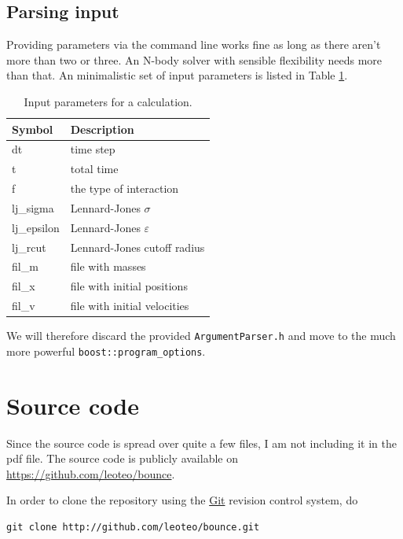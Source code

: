 \documentclass{scrartcl}
\begin{document}
\subsection{Parsing input}

Providing parameters via the command line works fine as long as there aren't
more than two or three.
An N-body solver with sensible flexibility needs more than that.
An minimalistic set of input parameters is listed in Table \ref{tab:input}.

\begin{table}
    \centering
\begin{tabular}[h!]{ll}
    Symbol & Description \\\hline
    dt & time step \\
    t & total time \\
    f & the type of interaction\\
    lj\_sigma & Lennard-Jones $\sigma$ \\
    lj\_epsilon & Lennard-Jones $\varepsilon$\\
    lj\_rcut & Lennard-Jones cutoff radius\\
    fil\_m & file with masses \\
    fil\_x & file with initial positions\\
    fil\_v & file with initial velocities
\end{tabular}
    \caption{Input parameters for a calculation.}
    \label{tab:input}
\end{table}

We will therefore discard the provided \verb|ArgumentParser.h| and move
to the much more powerful \verb|boost::program_options|.

\section{Source code}

Since the source code is spread over quite a few files,
I am not including it in the pdf file.
The source code is publicly available on
\url{https://github.com/leoteo/bounce}.

In order to clone the repository using the \href{http://git-scm.com}{Git} 
revision control system, do

\begin{verbatim}
git clone http://github.com/leoteo/bounce.git
\end{verbatim}
\end{document}
